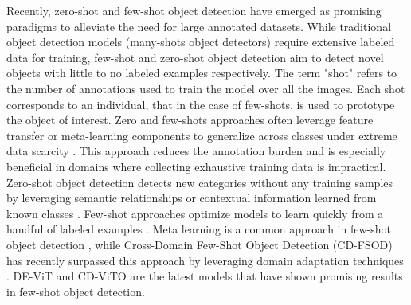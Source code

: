 \documentclass[journal,article,submit,pdftex,moreauthors]{Definitions/mdpi}
\begin{document}
Recently, zero-shot and few-shot object detection have emerged as promising paradigms
to alleviate the need for large annotated datasets.
While traditional object detection models (many-shots object detectors) require extensive labeled data for training, 
few-shot and zero-shot object detection aim to detect novel objects with little to 
no labeled examples respectively. The term "shot" refers to the number of annotations 
used to train the model over all the images. Each shot corresponds to an individual, 
that in the case of few-shots, is used to prototype the object of interest.
Zero and few-shots approaches often leverage feature transfer or meta-learning components to generalize 
across classes under extreme data scarcity \cite{liMetaSGDLearningLearn2017}. This approach reduces the annotation 
burden and is especially beneficial in domains where collecting exhaustive training 
data is impractical.
Zero-shot object detection detects new categories without any training samples by 
leveraging semantic relationships or contextual information learned from known classes \cite{bansalZeroShotObjectDetection2018}. 
Few-shot approaches optimize models to learn quickly from a handful of labeled examples \cite{huangSurveySelfSupervisedFewShot2022}.
Meta learning is a common approach in few-shot object detection 
\cite{MetaLearningBasedIncrementalFewShot,wuMetaRCNNMetaLearning2020,fuMetaSSDFastAdaptation2019,zhangMetaDETRFewShotObject2021}, 
while Cross-Domain Few-Shot Object Detection (CD-FSOD) has recently surpassed this
approach by leveraging domain adaptation techniques \cite{saBroaderStudyCrossdomain2023}.
DE-ViT \cite{xuDeViTDecomposingVision2023}  and CD-ViTO \cite{fuCrossDomainFewShotObject2024}  
are the latest models that have shown promising results in few-shot object detection.
\end{document}
